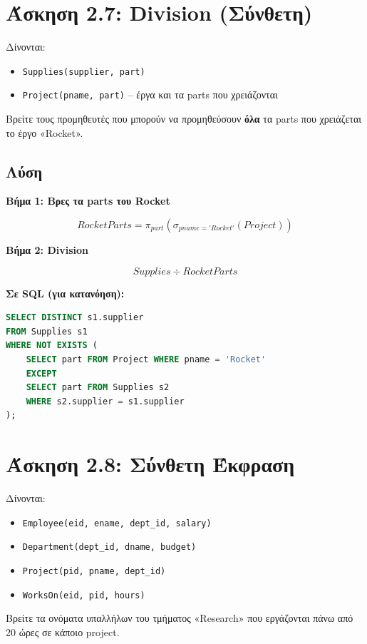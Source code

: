 \section{Άσκηση 2.7: Division (Σύνθετη)}

\begin{formulabox}[Εκφώνηση]
Δίνονται:
\begin{itemize}
    \item \texttt{Supplies(supplier, part)}
    \item \texttt{Project(pname, part)} -- έργα και τα parts που χρειάζονται
\end{itemize}

Βρείτε τους προμηθευτές που μπορούν να προμηθεύσουν \textbf{όλα} τα parts που
χρειάζεται το έργο «Rocket».
\end{formulabox}

\subsection*{Λύση}

\textbf{Βήμα 1: Βρες τα parts του Rocket}

$$RocketParts = \pi_{part}(\sigma_{pname='Rocket'}(Project))$$

\textbf{Βήμα 2: Division}

$$Supplies \div RocketParts$$

\textbf{Σε SQL (για κατανόηση):}

\begin{lstlisting}[language=SQL]
SELECT DISTINCT s1.supplier
FROM Supplies s1
WHERE NOT EXISTS (
    SELECT part FROM Project WHERE pname = 'Rocket'
    EXCEPT
    SELECT part FROM Supplies s2
    WHERE s2.supplier = s1.supplier
);
\end{lstlisting}

\section{Άσκηση 2.8: Σύνθετη Έκφραση}

\begin{formulabox}[Εκφώνηση]
Δίνονται:
\begin{itemize}
    \item \texttt{Employee(eid, ename, dept\_id, salary)}
    \item \texttt{Department(dept\_id, dname, budget)}
    \item \texttt{Project(pid, pname, dept\_id)}
    \item \texttt{WorksOn(eid, pid, hours)}
\end{itemize}

Βρείτε τα ονόματα υπαλλήλων του τμήματος «Research» που εργάζονται πάνω από 20 ώρες
σε κάποιο project.
\end{formulabox}

